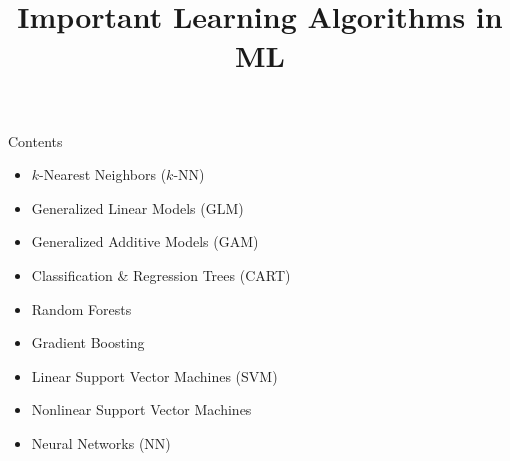 \documentclass[11pt,compress,t,notes=noshow, xcolor=table]{beamer}
\title{Important Learning Algorithms in ML}
\begin{document}

\sloppy

\begin{frame}{Contents}
  \begin{itemize}
    \item $k$-Nearest Neighbors ($k$-NN)
    \item Generalized Linear Models (GLM)
    \item Generalized Additive Models (GAM)
    \item Classification \& Regression Trees (CART)
    \item Random Forests
    \item Gradient Boosting
    \item Linear Support Vector Machines (SVM)
    \item Nonlinear Support Vector Machines
    \item Neural Networks (NN)
  \end{itemize}
\end{frame}
\end{document}

